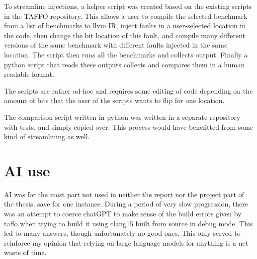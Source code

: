 To streamline injections, a helper script was created based on the existing scripts in the TAFFO repository. This allows a user to compile the selected benchmark from a list of benchmarks to llvm IR, inject faults in a user-selected location in the code, then change the bit location of this fault, and compile many different versions of the same benchmark with different faults injected in the same location. The script then runs all the benchmarks and collects output. Finally a python script that reads these outputs collects and compares them in a human readable format.

The scripts are rather ad-hoc and requires some editing of code depending on the amount of bits that the user of the scripts wants to flip for one location.

The comparison script written in python was written in a separate repository with tests, and simply copied over. This process would have benefitted from some kind of streamlining as well. 

\section{AI use}
AI was for the most part not used in neither the report nor the project part of the thesis, save for one instance. During a period of very slow progression, there was an attempt to coerce chatGPT to make sense of the build errors given by taffo when trying to build it using clang15 built from source in debug mode. This led to many answers, though unfortunately no good ones. This only served to reinforce my opinion that relying on large language models for anything is a net waste of time. 
